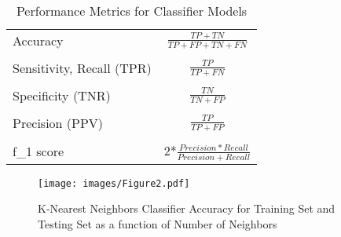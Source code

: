 \documentclass[sigconf]{acmart}
\begin{document}


\begin{table}
  \caption{Performance Metrics for Classifier Models}
  \label{tab:freq}
  \begin{tabular}{lc}
    \toprule
    Accuracy & \(\frac{TP+TN}{TP+FP+TN+FN}\) \\
    & \\
    Sensitivity, Recall (TPR) &  \(\frac{TP}{TP+FN}\) \\
    & \\
    Specificity (TNR) &  \(\frac{TN}{TN+FP}\) \\
    & \\
    Precision (PPV) & \(\frac{TP}{TP+FP}\)  \\
    & \\
    f_1 score & 2*\(\frac{Precision*Recall}{Precision+Recall}\) 
    & \\
    \bottomrule
  \end{tabular}
\end{table}


\begin{figure}[!ht]
  \centering\texttt{[image: images/Figure2.pdf]}
  \caption{K-Nearest Neighbors Classifier Accuracy for Training Set and 
  Testing Set as a function of Number of Neighbors}
  \label{f:Figure2}
\end{figure}

\end{document}
